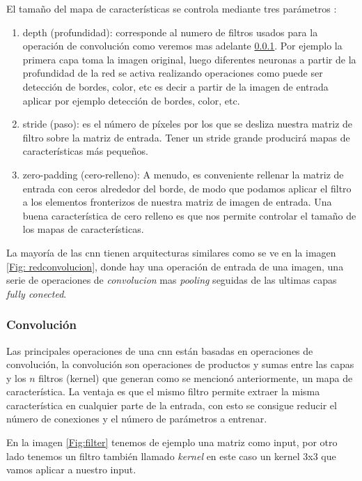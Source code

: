 El tamaño del mapa de características se controla mediante tres parámetros \citep{cnnsarticle}:
\begin{enumerate}
\item depth (profundidad): corresponde al numero de filtros usados para la operación de convolución como veremos mas adelante \ref{sub:convolucion}. Por ejemplo la primera capa toma la imagen original, luego diferentes neuronas a partir de la profundidad de la red se activa realizando operaciones como puede ser detección de bordes, color, etc
es decir a partir de la imagen de entrada aplicar por ejemplo detección de bordes, color, etc.
\item stride (paso): es el número de píxeles por los que se desliza nuestra matriz de filtro sobre la matriz de entrada. Tener un stride grande producirá mapas de características más pequeños.
\item zero-padding (cero-relleno): A menudo, es conveniente rellenar la matriz de entrada con ceros alrededor del borde, de modo que podamos aplicar el filtro a los elementos fronterizos de nuestra matriz de imagen de entrada. Una buena característica de cero relleno es que nos permite controlar el tamaño de los mapas de características.
\end{enumerate}

La mayoría de las \ac{cnn} tienen arquitecturas similares como se ve en la imagen \ref{Fig: redconvolucion}, donde hay una operación de entrada de una imagen, una serie de operaciones de  \textit{convolucion} mas  \textit{pooling} seguidas de las ultimas capas \textit{fully conected}. 

\subsubsection{Convolución}\label{sub:convolucion}
Las principales operaciones de una \ac{cnn} están basadas en operaciones de convolución, la convolución son operaciones de productos y sumas entre las capas y los $n $ filtros (kernel) que generan como se mencionó anteriormente, un mapa de característica. La ventaja es que el mismo filtro permite extraer la misma característica en cualquier parte de la entrada, con esto se consigue reducir el número de conexiones y el número de parámetros a entrenar.

En la imagen \ref{Fig:filter} tenemos de ejemplo una matriz como input, por otro lado tenemos un filtro también llamado \textit{kernel} en este caso un kernel 3x3 que vamos aplicar a nuestro input.

